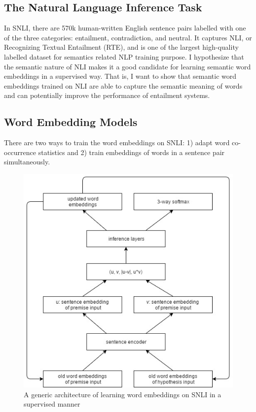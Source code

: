 \documentclass[10pt,twocolumn,letterpaper]{article}
\begin{document}
\subsection{The Natural Language Inference Task}
In SNLI, there are 570k human-written English sentence pairs labelled with one of the three categories: entailment, contradiction, and neutral. It captures NLI, or Recognizing Textual Entailment (RTE), and is one of the largest high-quality labelled dataset for semantics related NLP training purpose. I hypothesize that the semantic nature of NLI makes it a good candidate for learning semantic word embeddings in a supervised way. That is, I want to show that semantic word embeddings trained on NLI are able to capture the semantic meaning of words and can potentially improve the performance of entailment systems.

\subsection{Word Embedding Models}
There are two ways to train the word embeddings on SNLI: 1) adapt word co-occurrence statistics and 2) train embeddings of words in a sentence pair simultaneously.

\begin{figure}[t]
\begin{center}
\includegraphics[scale=0.4]{model_architecture}
\end{center}
\caption{A generic architecture of learning word embeddings on SNLI in a supervised manner}
\label{fig:model_arc}
\end{figure}
\end{document}

